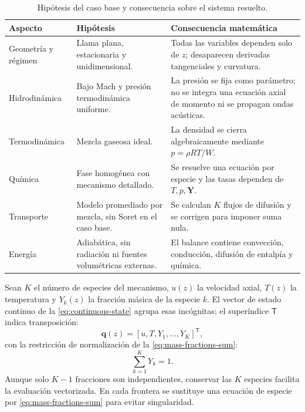 \documentclass[12pt,a4paper,twoside,openany]{book}
\newcommand{\vect}[1]{\bm{#1}}
\begin{document}
\begin{table}[htbp]
\centering
\caption{Hipótesis del caso base y consecuencia sobre el sistema resuelto.}
\label{tab:model-assumptions}
\begin{tabularx}{\textwidth}{@{}p{}YY@{}}
\toprule
\textbf{Aspecto} & \textbf{Hipótesis} & \textbf{Consecuencia matemática} \\
\midrule
Geometría y régimen & Llama plana, estacionaria y unidimensional. & Todas las
variables dependen solo de \(z\); desaparecen derivadas tangenciales y
curvatura. \\
Hidrodinámica & Bajo Mach y presión termodinámica uniforme. & La presión se fija
como parámetro; no se integra una ecuación axial de momento ni se propagan ondas
acústicas. \\
Termodinámica & Mezcla gaseosa ideal. & La densidad se cierra algebraicamente
mediante \(p=\rho RT/W\). \\
Química & Fase homogénea con mecanismo detallado. & Se resuelve una ecuación por
especie y las tasas dependen de \(T,p,\vect Y\). \\
Transporte & Modelo promediado por mezcla, sin Soret en el caso base. & Se
calculan \(K\) flujos de difusión y se corrigen para imponer suma nula. \\
Energía & Adiabática, sin radiación ni fuentes volumétricas externas. & El
balance contiene convección, conducción, difusión de entalpía y química. \\
\bottomrule
\end{tabularx}
\end{table}

Sean \(K\) el número de especies del mecanismo, \(u(z)\) la velocidad axial,
\(T(z)\) la temperatura y \(Y_k(z)\) la fracción másica de la especie \(k\).
El vector de estado continuo de la \cref{eq:continuous-state} agrupa esas
incógnitas; el superíndice \(\mathsf T\) indica transposición:
\begin{equation}
  \vect{q}(z)=\left[u,T,Y_1,\ldots,Y_K\right]^{\mathsf T},
  \label{eq:continuous-state}
\end{equation}
con la restricción de normalización de la \cref{eq:mass-fractions-sum}:
\begin{equation}
  \sum_{k=1}^{K}Y_k=1.
  \label{eq:mass-fractions-sum}
\end{equation}
Aunque solo \(K-1\) fracciones son independientes, conservar las \(K\) especies
facilita la evaluación vectorizada. En cada frontera se sustituye una ecuación
de especie por \cref{eq:mass-fractions-sum} para evitar singularidad.
\end{document}
